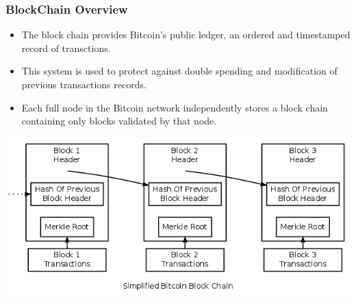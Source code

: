 \begin{frame}
    \frametitle{BlockChain Overview}
    \begin{itemize}
        \item The block chain provides Bitcoin's public ledger, an ordered and timestamped record of transctions.
        \item This system is used to protect against double spending and modification of previous transactions records.
        \item Each full node in the Bitcoin network independently stores a block chain containing only blocks validated by that node.
    \end{itemize}
    \includegraphics[scale=0.4]{./figures/en-blockchain-overview.png}
\end{frame}

